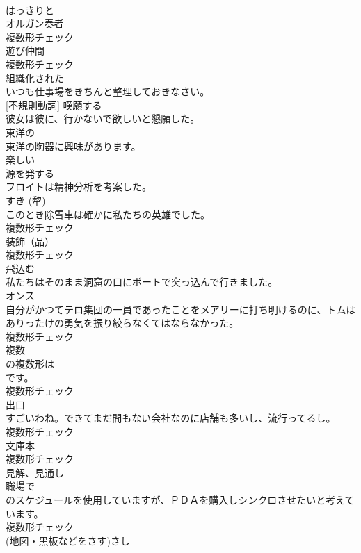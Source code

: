 \documentclass[8pt]{extreport}
\begin{document}
\begin{CJK}{UTF8}{min}
\\	[副詞]	はっきりと	
\\	[名詞]	オルガン奏者	
\\	複数形チェック
\\	[名詞]	遊び仲間	
\\	複数形チェック
\\	[形容詞]	組織化された	
\\	いつも仕事場をきちんと整理しておきなさい。	
\\	[動詞] [不規則動詞]	嘆願する	
\\	彼女は彼に、行かないで欲しいと懇願した。	
\\	[形容詞]	東洋の	
\\	東洋の陶器に興味があります。	
\\	[形容詞]	楽しい	
\\	[動詞]	源を発する	
\\	フロイトは精神分析を考案した。	
\\	[名詞]	すき (犂)	
\\	このとき除雪車は確かに私たちの英雄でした。	
\\	複数形チェック
\\	[名詞]	装飾（品）	
\\	複数形チェック
\\	[動詞]	飛込む	
\\	私たちはそのまま洞窟の口にボートで突っ込んで行きました。	
\\	[名詞]	オンス	
\\	自分がかつてテロ集団の一員であったことをメアリーに打ち明けるのに、トムはありったけの勇気を振り絞らなくてはならなかった。	
\\	複数形チェック
\\	[名詞]	複数	
\\	の複数形は
\\	です。	
\\	複数形チェック
\\	[名詞]	出口	
\\	すごいわね。できてまだ間もない会社なのに店舗も多いし、流行ってるし。	
\\	複数形チェック
\\	[名詞]	文庫本	
\\	複数形チェック
\\	[名詞]	見解、見通し	
\\	職場で
\\	のスケジュールを使用していますが、ＰＤＡを購入しシンクロさせたいと考えています。	
\\	複数形チェック
\\	[名詞]	(地図・黑板などをさす)さし	

\end{CJK}
\end{document}
